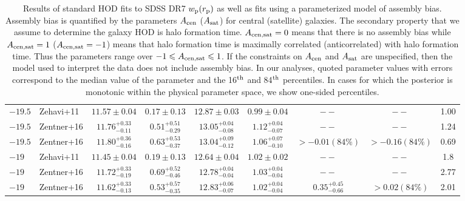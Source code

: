 \documentclass[usenatbib,usegraphicx,letterpaper]{mn2e}
\begin{document}
\begin{table}
{\begin{tabular}{l l c c c c c c c}
$-19.5$ & Zehavi+11 & $11.57 \pm 0.04$ & $0.17 \pm 0.13$ & $12.87 \pm 0.03$ & $0.99 \pm 0.04$ & $--$ & $--$ & 1.00 \\
$-19.5$ & Zentner+16 & $11.76^{+0.33}_{-0.11}$ & $0.51^{+0.51}_{-0.29}$ & $13.05^{+0.04}_{-0.08}$ & $1.12^{+0.04}_{-0.07}$ & $--$ & $--$ & 1.24\\
$-19.5$ & Zentner+16 & $11.80^{+0.36}_{-0.16}$ & $0.63^{+0.53}_{-0.37}$ & $13.04^{+0.09}_{-0.12}$ & $1.06^{+0.07}_{-0.10}$ & $>-0.01 (84\%)$ & $>-0.16 (84\%)$ & 0.69 \vspace*{5pt}\\
%
$-19$ & Zehavi+11 & $11.45 \pm 0.04$ & $0.19 \pm 0.13$ & $12.64 \pm 0.04$ & $1.02 \pm 0.02$ & $--$ & $--$ & 1.8 \\
$-19$ & Zentner+16 & $11.72^{+0.33}_{-0.19}$ & $0.69^{+0.52}_{-0.46}$ & $12.78^{+0.04}_{-0.04}$ & $1.03^{+0.04}_{-0.04}$ & $--$ & $--$ & 2.77\\
$-19$ & Zentner+16 & $11.62^{+0.33}_{-0.13}$ & $0.53^{+0.57}_{-0.35}$ & $12.83^{+0.06}_{-0.07}$ & $1.02^{+0.04}_{-0.04}$ & $0.35^{+0.45}_{-0.66}$ & $>0.02 (84\%)$ & 2.01\\
\hline
\end{tabular}
\medskip
\caption{
Results of standard HOD fits to SDSS DR7 $w_{\rm p}(r_{\rm p})$ as well as 
fits using a parameterized model of assembly bias. 
Assembly bias is quantified by the parameters $A_{\rm cen}$ ($A_{\rm sat}$) for central (satellite) galaxies. The secondary 
property that we assume to determine the galaxy HOD is halo formation time. $A_{\rm cen,sat}=0$ means that there is no 
assembly bias while $A_{\rm cen,sat}=1$ ($A_{\rm cen,sat}=-1$) means that halo formation time is maximally 
correlated (anticorrelated) with halo formation time. Thus the parameters range over $-1 \le A_{\rm cen,sat} \le 1$. 
If the constraints on $A_{\rm cen}$ and $A_{\rm sat}$ are unspecified, then the model used to interpret the data 
does not include assembly bias. In our analyses, quoted parameter values with errors correspond to the median 
value of the parameter and the 16$^{\rm th}$ and 84$^{\rm th}$ percentiles. In cases for which the posterior 
is monotonic within the physical parameter space, we show one-sided percentiles.
}
}
 \label{table:parameters}
\end{table}
\end{document}
